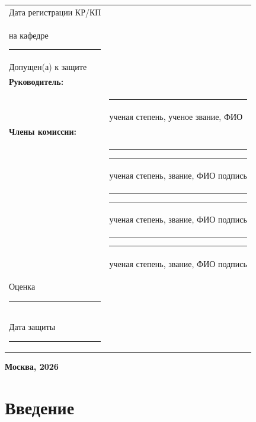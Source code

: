 \documentclass[14pt, a4paper]{extreport}
\begin{document}
\begin{titlepage}
\begin{flushright}
\begin{tabular}{l l}
            Дата регистрации КР/КП & \\
            на кафедре \rule{4cm}{0.4pt} & \\[0.3cm]
            
            Допущен(а) к защите & \\[0.4cm]
            
            \textbf{Руководитель:} & \\
            & \rule{6cm}{0.4pt} \\
            & \small ученая степень, ученое звание, ФИО \\[0.3cm]
            
            \textbf{Члены комиссии:} & \\
            & \rule{5cm}{0.4pt} \quad \rule{2.5cm}{0.4pt} \\
            & \small ученая степень, звание, ФИО \quad подпись \\[0.15cm]
            & \rule{5cm}{0.4pt} \quad \rule{2.5cm}{0.4pt} \\
            & \small ученая степень, звание, ФИО \quad подпись \\[0.15cm]
            & \rule{5cm}{0.4pt} \quad \rule{2.5cm}{0.4pt} \\
            & \small ученая степень, звание, ФИО \quad подпись \\[0.3cm]
            
            Оценка \rule{4cm}{0.4pt} & \\
            Дата защиты \rule{4cm}{0.4pt} & \\
        \end{tabular}
    \end{flushright}
    
    \vspace{0.3cm}
    \begin{center}
        \textbf{\large Москва, 2026}
    \end{center}
\end{titlepage}

\tableofcontents
\newpage

\chapter*{Введение}
\end{document}
